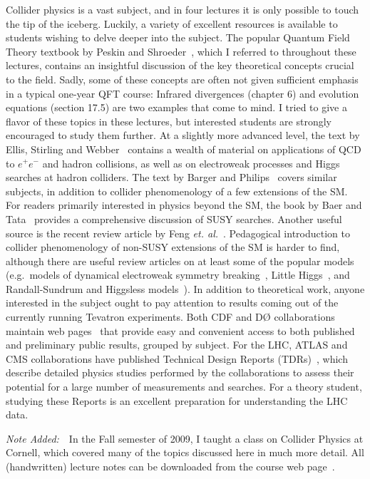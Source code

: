 \documentclass{ws-procs9x6}
\begin{document}
Collider physics is a vast subject, and in four lectures it is only possible to touch the tip of the iceberg. Luckily, a variety of excellent resources is available to students wishing to delve deeper into the subject. The popular Quantum Field Theory textbook by Peskin and Shroeder~\cite{PS}, which I referred to throughout these lectures, contains an insightful discussion of the key theoretical concepts crucial to the field. Sadly, some of these concepts are often not given sufficient emphasis in a typical one-year QFT course: Infrared divergences (chapter 6) and evolution equations (section 17.5) are two examples that come to mind. I tried to give a flavor of these topics in these lectures, but interested students are strongly encouraged to study them further. At a slightly more advanced level, the text by Ellis, Stirling and Webber~\cite{ESW} contains a wealth of material on applications of QCD to $e^+e^-$ and hadron collisions, as well as on electroweak processes and Higgs searches at hadron colliders. The text by Barger and Philips~\cite{BP} covers similar subjects, in addition to collider phenomenology of a few extensions of the SM. For readers primarily interested in physics beyond the SM, the book by Baer and Tata~\cite{BT} provides a comprehensive discussion of SUSY searches. Another useful source is the recent review article by Feng {\it et. al.}~\cite{Feng}. Pedagogical introduction to collider phenomenology of non-SUSY extensions of the SM is harder to find, although there are useful review articles on at least some of the popular models (e.g.~models of dynamical electroweak symmetry breaking~\cite{DEWSB_review}, Little Higgs~\cite{LH_review}, and Randall-Sundrum and Higgsless models~\cite{RS_review}). 
In addition to theoretical work, anyone interested in the subject ought to pay attention to results coming out of the currently running Tevatron experiments. Both CDF and D{\O} collaborations maintain web pages~\cite{CDF_web,D0_web} that provide easy and convenient access to both published and preliminary public results, grouped by subject. For the LHC, ATLAS and CMS collaborations have published Technical Design Reports (TDRs)~\cite{ATLAS_TDR,CMS_TDR}, which describe detailed physics studies performed by the collaborations to assess their potential for a large number of measurements and searches. For a theory student, studying these Reports is an excellent preparation for understanding the LHC data.  

{\it Note Added:}~~In the Fall semester of 2009, I taught a class on Collider Physics at Cornell, which covered many of the topics discussed here in much more detail. All (handwritten) lecture notes can be downloaded from the course web page~\cite{P7661_web}. 
\end{document}
